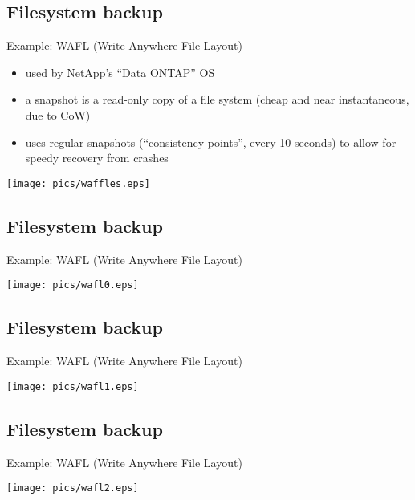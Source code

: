 \documentclass[xga]{xdvislides}
\begin{document}
\subsection{Filesystem backup}
Example: WAFL (Write Anywhere File Layout)
\begin{itemize}
	\item used by NetApp's ``Data ONTAP'' OS
	\item a snapshot is a read-only copy of a file system (cheap and near
		instantaneous, due to CoW)
	\item uses regular snapshots (``consistency points'', every 10 seconds)
		to allow for speedy recovery from crashes
\end{itemize}
\vspace*{\fill}
\begin{center}
	\texttt{[image: pics/waffles.eps]}
\end{center}
\vspace*{\fill}


\subsection{Filesystem backup}
Example: WAFL (Write Anywhere File Layout)
\vspace*{\fill}
\begin{center}
	\texttt{[image: pics/wafl0.eps]}
\end{center}
\vspace*{\fill}


\subsection{Filesystem backup}
Example: WAFL (Write Anywhere File Layout)
\vspace*{\fill}
\begin{center}
	\texttt{[image: pics/wafl1.eps]}
\end{center}
\vspace*{\fill}


\subsection{Filesystem backup}
Example: WAFL (Write Anywhere File Layout)
\vspace*{\fill}
\begin{center}
	\texttt{[image: pics/wafl2.eps]}
\end{center}
\vspace*{\fill}
\end{document}
